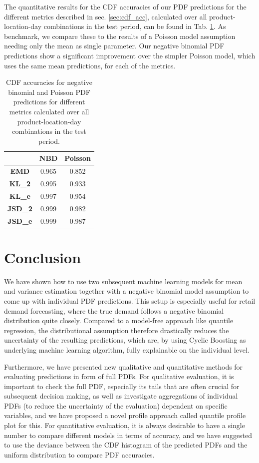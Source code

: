 \documentclass[BCOR=1mm, DIV=calc,10pt,
twoside=true,
twocolumn,
headings=normal]{scrartcl}
\newcommand{\tab}{Tab. }
\begin{document}
The quantitative results for the CDF accuracies of our PDF predictions for the different metrics described in sec. \ref{sec:cdf_acc}, calculated over all product-location-day combinations in the test period, can be found in \tab \ref{tab:cdf:acc}. As benchmark, we compare these to the results of a Poisson model assumption needing only the mean as single parameter. Our negative binomial PDF predictions show a significant improvement over the simpler Poisson model, which uses the same mean predictions, for each of the metrics.

\begin{table}[h!]
\begin{center}
\caption{CDF accuracies for negative binomial and Poisson PDF predictions for different metrics calculated over all product-location-day combinations in the test period.}
\label{tab:cdf:acc}
\begin{tabular}{c|c|c}
 & \textbf{NBD} & \textbf{Poisson} \\
\hline
\textbf{EMD} & 0.965 & 0.852 \\
\textbf{KL\_2} & 0.995 & 0.933 \\
\textbf{KL\_e} & 0.997 & 0.954 \\
\textbf{JSD\_2} & 0.999 & 0.982 \\
\textbf{JSD\_e} & 0.999 & 0.987
\end{tabular}
\end{center}
\end{table}


\section{Conclusion}

We have shown how to use two subsequent machine learning models for mean and variance estimation together with a negative binomial model assumption to come up with individual PDF predictions. This setup is especially useful for retail demand forecasting, where the true demand follows a negative binomial distribution quite closely. Compared to a model-free approach like quantile regression, the distributional assumption therefore drastically reduces the uncertainty of the resulting predictions, which are, by using Cyclic Boosting as underlying machine learning algorithm, fully explainable on the individual level.

Furthermore, we have presented new qualitative and quantitative methods for evaluating predictions in form of full PDFs. For qualitative evaluation, it is important to check the full PDF, especially its tails that are often crucial for subsequent decision making, as well as investigate aggregations of individual PDFs (to reduce the uncertainty of the evaluation) dependent on specific variables, and we have proposed a novel profile approach called quantile profile plot for this. For quantitative evaluation, it is always desirable to have a single number to compare different models in terms of accuracy, and we have suggested to use the deviance between the CDF histogram of the predicted PDFs and the uniform distribution to compare PDF accuracies.
\end{document}
